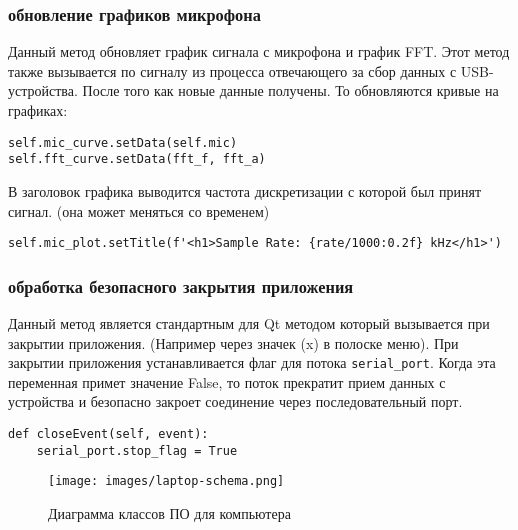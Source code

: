 \documentclass[../main.tex]{subfiles}
\begin{document}
\subsubsection{обновление графиков микрофона}
Данный метод обновляет график сигнала с микрофона и график FFT. Этот метод также вызывается по сигналу из процесса отвечающего за сбор данных с USB-устройства. После того как новые данные получены. То обновляются кривые на графиках:

\begin{lstlisting}
self.mic_curve.setData(self.mic)
self.fft_curve.setData(fft_f, fft_a)
\end{lstlisting}

В заголовок графика выводится частота дискретизации с которой был принят сигнал. (она может меняться со временем)
\begin{lstlisting}
self.mic_plot.setTitle(f'<h1>Sample Rate: {rate/1000:0.2f} kHz</h1>')
\end{lstlisting}

\subsubsection{обработка безопасного закрытия приложения}
Данный метод является стандартным для Qt методом который вызывается при закрытии приложения. (Например через значек (x) в полоске меню). При закрытии приложения устанавливается флаг для потока \verb|serial_port|. Когда эта переменная примет значение False, то поток прекратит прием данных с устройства и безопасно закроет соединение через последовательный порт.

\begin{lstlisting}
def closeEvent(self, event):
    serial_port.stop_flag = True
\end{lstlisting}

\begin{figure}[H]
\centering
\texttt{[image: images/laptop-schema.png]}
\caption{Диаграмма классов ПО для компьютера}
\end{figure}




\newpage
\end{document}
